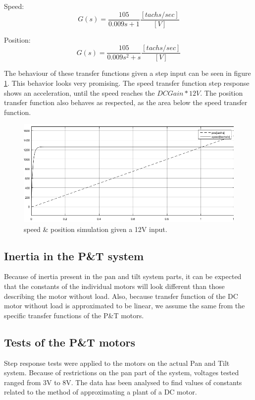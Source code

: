 Speed:
\begin{equation}
G(s)=\frac{105}{0.009s+1} \frac{[tachs/sec]}{[V]}
\end{equation}

Position:
\begin{equation}
G(s)=\frac{105}{0.009s^2+s} \frac{[tachs/sec]}{[V]}
\end{equation}

The behaviour of these transfer functions given a step input can be seen in figure \ref{fig:SpeedPosSim12V}. This behavior looks very promising. The speed transfer function step response shows an acceleration, until the speed reaches the $DC Gain * 12V$. The position transfer function also behaves as respected, as the area below the speed transfer function. 

\begin{figure}[h!]
\centering
\includegraphics[scale=0.6]{Billeder/SpeedPosSim12V.png}
\caption{speed \& position simulation given a 12V input.}
\label{fig:SpeedPosSim12V}
\end{figure}

\subsection{Inertia in the P\&T system}
Because of inertia present in the pan and tilt system parts, it can be expected that the constants of the individual motors will look different than those describing the motor without load. Also, because transfer function of the DC motor without load is approximated to be linear, we assume the same from the specific transfer functions of the P\&T motors.

\subsection{Tests of the P\&T motors}
Step response tests were applied to the motors on the actual Pan and Tilt system. Because of restrictions on the pan part of the system, voltages tested ranged from 3V to 8V. The data has been analysed to find values of constants related to the method of approximating a plant of a DC motor.

